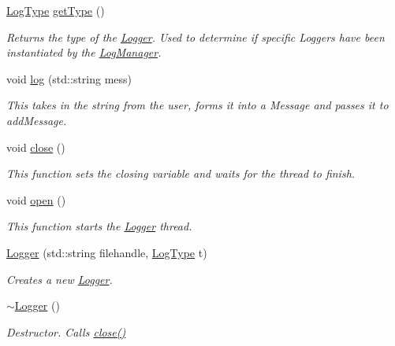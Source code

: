 \begin{DoxyCompactItemize}
\item 
\mbox{\hyperlink{namespace_world_architect_adf13e54f2c38346ed9d5013cff07fc8e}{Log\+Type}} \mbox{\hyperlink{class_world_architect_1_1_logger_a9baaacdb933276d67f4e1d7c213ceda0}{get\+Type}} ()
\begin{DoxyCompactList}\small\item\em Returns the type of the \mbox{\hyperlink{class_world_architect_1_1_logger}{Logger}}. Used to determine if specific Loggers have been instantiated by the \mbox{\hyperlink{class_world_architect_1_1_log_manager}{Log\+Manager}}. \end{DoxyCompactList}\item 
void \mbox{\hyperlink{class_world_architect_1_1_logger_a64e7c69902bcf71209f43b2c67d6a169}{log}} (std\+::string mess)
\begin{DoxyCompactList}\small\item\em This takes in the string from the user, forms it into a Message and passes it to add\+Message. \end{DoxyCompactList}\item 
void \mbox{\hyperlink{class_world_architect_1_1_logger_afee2bab560c2db0190c980884d33868c}{close}} ()
\begin{DoxyCompactList}\small\item\em This function sets the closing variable and waits for the thread to finish. \end{DoxyCompactList}\item 
void \mbox{\hyperlink{class_world_architect_1_1_logger_a751cd1a942f2bfce73ec61feaa439d22}{open}} ()
\begin{DoxyCompactList}\small\item\em This function starts the \mbox{\hyperlink{class_world_architect_1_1_logger}{Logger}} thread. \end{DoxyCompactList}\item 
\mbox{\hyperlink{class_world_architect_1_1_logger_a0622bdbc65338ff51fac19c5b0605639}{Logger}} (std\+::string filehandle, \mbox{\hyperlink{namespace_world_architect_adf13e54f2c38346ed9d5013cff07fc8e}{Log\+Type}} t)
\begin{DoxyCompactList}\small\item\em Creates a new \mbox{\hyperlink{class_world_architect_1_1_logger}{Logger}}. \end{DoxyCompactList}\item 
\mbox{\hyperlink{class_world_architect_1_1_logger_acb668a9e186a25fbaad2e4af6d1ed00a}{$\sim$\+Logger}} ()
\begin{DoxyCompactList}\small\item\em Destructor. Calls \mbox{\hyperlink{class_world_architect_1_1_logger_afee2bab560c2db0190c980884d33868c}{close()}} \end{DoxyCompactList}\end{DoxyCompactItemize}


